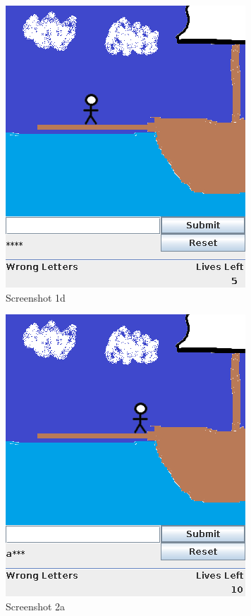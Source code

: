 \documentclass[notitlepage]{report}
\begin{document}
\begin{multicols}{2}
\begin{figure}[H]
\centering
\includegraphics[scale=0.5]{TestScreenshots/1d}
\caption{Screenshot 1d}
\end{figure}

\begin{figure}[H]
\centering
\includegraphics[scale=0.5]{TestScreenshots/2a}
\caption{Screenshot 2a}
\end{figure}


\end{multicols}
\end{document}
